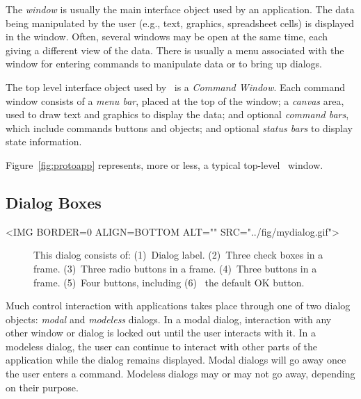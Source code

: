 The \emph{window} is usually the main interface object used by an
application. The data being manipulated by the user (e.g.,
text, graphics, spreadsheet cells) is displayed in the window. Often,
several windows may be open at the same time, each giving
a different view of the data. There is usually a menu associated
with the window for entering commands to manipulate data or
to bring up dialogs.

The top level interface object
used by \V\ is a \emph{Command Window}. Each command window
consists of a \emph{menu bar}, placed at the
top of the window;  a \emph{canvas}
area, used to draw text and graphics to display the data; 
and optional \emph{command bars},
which include commands buttons and objects; and optional
\emph{status bars} to display state information.

Figure~\ref{fig:protoapp} represents, more or less, a typical
top-level \V\ window. 

\subsection*{Dialog Boxes}

\begin{rawhtml}
<IMG BORDER=0 ALIGN=BOTTOM ALT="" SRC="../fig/mydialog.gif">
\end{rawhtml}

\begin{figure}[htb]
\begin{center}
\small

\begin{latexonly}

\end{latexonly}

\normalfont\normalsize
\end{center}

\caption{This dialog consists of: (1)~Dialog label. (2)~Three check boxes
in a frame. (3)~Three radio buttons in a frame. (4)~Three buttons
in a frame. (5)~Four buttons, including (6)~ the default OK
button.} \label{fig:mydialog}
\end{figure}

Much control interaction with \V applications takes place
through one of two dialog objects: \emph{modal}
and \emph{modeless} dialogs. In a modal dialog, interaction with
any other window or dialog is locked out until the user
interacts with it. In a modeless dialog, the user can continue to
interact with other parts of the application while the dialog remains
displayed. Modal dialogs will go away once the user enters a
command. Modeless dialogs may or may not go away, depending on
their purpose.

